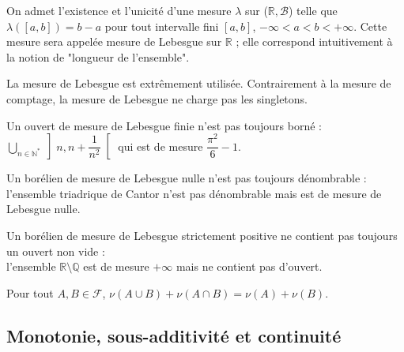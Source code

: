 \documentclass[landscape,twocolumn]{article}
\begin{document}
\begin{exe}
On admet l'existence et l'unicité d'une mesure $\lambda$ sur ($\mathbb{R}, \mathcal{B}$) telle que $\lambda([a,b])=b-a$ pour tout intervalle fini $[a,b]$, $-\infty < a < b < + \infty$. Cette mesure sera appelée mesure de Lebesgue sur $\mathbb{R}$ ; elle correspond intuitivement à la notion de "longueur de l'ensemble".
\end{exe}

\begin{astu}
La mesure de Lebesgue est extrêmement utilisée. Contrairement à la mesure de comptage, la mesure de Lebesgue ne charge pas les singletons. 
\end{astu}

\begin{att}
Un ouvert de mesure de Lebesgue finie n'est pas toujours borné : \\
$\bigcup \limits_{n \in \mathbb{N}^*} \left] n,n+\dfrac{1}{n^2} \right[ $ qui est de mesure $\dfrac{\pi^2}{6}-1$. 
\end{att}

\begin{att}
Un borélien de mesure de Lebesgue nulle n'est pas toujours dénombrable : \\
l'ensemble triadrique de Cantor n'est pas dénombrable mais est de mesure de Lebesgue nulle.
\end{att}

\begin{att}
Un borélien de mesure de Lebesgue strictement positive ne contient pas toujours un ouvert non vide : \\
l'ensemble $\mathbb{R} \setminus \mathbb{Q}$  est de mesure $+ \infty$ mais ne contient pas d'ouvert.
\end{att}

\begin{lemme}
Pour tout $A, B \in \mathcal{F}$, $\nu (A \cup B) + \nu (A \cap B) = \nu (A) + \nu (B)$.
\end{lemme}

\subsection{Monotonie, sous-additivité et continuité}
\end{document}
